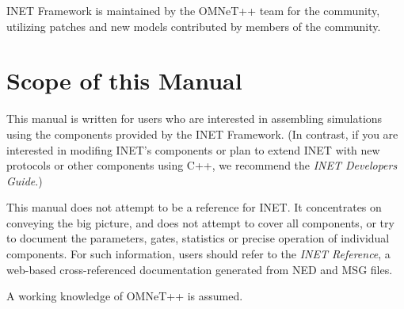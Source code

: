 INET Framework is maintained by the OMNeT++ team for the community, 
utilizing patches and new models contributed by members of the community.

\section{Scope of this Manual}

This manual is written for users who are interested in assembling
simulations using the components provided by the INET Framework.
(In contrast, if you are interested in modifing INET's components or plan 
to extend INET with new protocols or other components using C++, 
we recommend the \textit{INET Developers Guide}.)

This manual does not attempt to be a reference for INET. It concentrates
on conveying the big picture, and does not attempt to cover all 
components, or try to document the parameters, gates, statistics or 
precise operation of individual components. For such information, 
users should refer to the \textit{INET Reference}, a web-based 
cross-referenced documentation generated from NED and MSG files.
 
A working knowledge of OMNeT++ is assumed.



